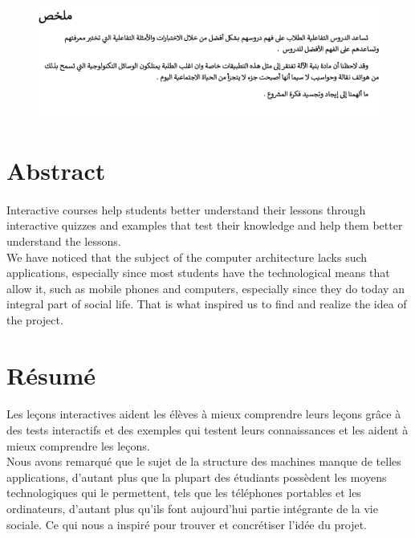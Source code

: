 \begin{figure}[ht]
	\centering
	\label{}\includegraphics[scale=0.8]{img/resume.pdf} 
                
\end{figure}

\section*{Abstract}
\paragraph{}Interactive courses help students better understand their lessons through interactive quizzes and examples that test their knowledge and help them better understand the lessons.
\\We have noticed that the subject of the computer architecture lacks such applications, especially since most students have the technological means that allow it, such as mobile phones and computers, especially since they do today an integral part of social life.
That is what inspired us to find and realize the idea of the project.
\paragraph{}


\section*{Résumé}

\paragraph{}Les leçons interactives aident les élèves à mieux comprendre leurs leçons grâce à des tests interactifs et des exemples qui testent leurs connaissances et les aident à mieux comprendre les leçons.
\\ Nous avons remarqué que le sujet de la structure des machines manque de telles applications, d'autant plus que la plupart des étudiants possèdent les moyens technologiques qui le permettent, tels que les téléphones portables et les ordinateurs, d'autant plus qu'ils font aujourd'hui partie intégrante de la vie sociale.
Ce qui nous a inspiré pour trouver et concrétiser l'idée du projet.



